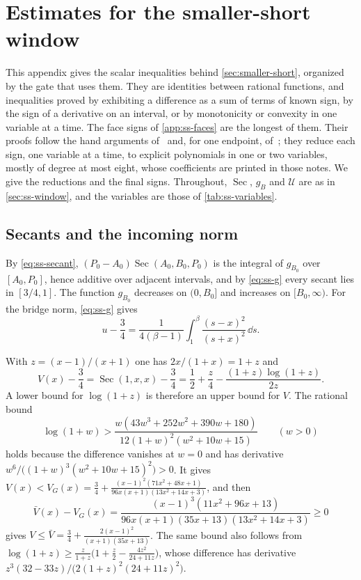 \section{Estimates for the smaller-short window}\label{app:short-estimates}

This appendix gives the scalar inequalities behind \cref{sec:smaller-short}, organized by the
gate that uses them. They are identities between rational functions, and inequalities proved by
exhibiting a difference as a sum of terms of known sign, by the sign of a derivative on an
interval, or by monotonicity or convexity in one variable at a time. The face signs of
\cref{app:ss-faces} are the longest of them. Their proofs follow the hand arguments
of~\cite{LighterProofs} and, for one endpoint, of~\cite{Notes}; they reduce each sign, one
variable at a time, to explicit polynomials in one or two variables, mostly of degree at most
eight, whose coefficients are printed in those notes. We give the reductions and the final signs.
Throughout, $\operatorname{Sec}$, $g_B$ and $\mathcal U$ are as in \cref{sec:ss-window}, and the
variables are those of \cref{tab:ss-variables}.

\subsection{Secants and the incoming norm}\label{app:ss-secant}

By \eqref{eq:ss-secant}, $(P_0-A_0)\operatorname{Sec}(A_0,B_0,P_0)$ is the integral of $g_{B_0}$
over $[A_0,P_0]$, hence additive over adjacent intervals, and by \eqref{eq:ss-g} every secant lies
in $[3/4,1]$. The function $g_{B_0}$ decreases on $(0,B_0]$ and increases on $[B_0,\infty)$. For
the bridge norm, \eqref{eq:ss-g} gives
\begin{equation}\label{eq:ss-u-integral}
  u-\frac34=\frac{1}{4(\beta-1)}\int_1^\beta\frac{(s-x)^2}{(s+x)^2}\,\dd s .
\end{equation}

 With $z=(x-1)/(x+1)$ one has $2x/(1+x)=1+z$ and
\[
  V(x)-\frac34=\operatorname{Sec}(1,x,x)-\frac34=\frac12+\frac z4-\frac{(1+z)\log(1+z)}{2z}.
\]
A lower bound for $\log(1+z)$ is therefore an upper bound for $V$. The rational bound
\[
  \log(1+w)>\frac{w(43w^3+252w^2+390w+180)}{12(1+w)^2(w^2+10w+15)}\qquad(w>0)
\]
holds because the difference vanishes at $w=0$ and has derivative
$w^6/\bigl((1+w)^3(w^2+10w+15)^2\bigr)>0$. It gives
$V(x)<V_G(x)=\frac34+\frac{(x-1)^2(71x^2+48x+1)}{96x(x+1)(13x^2+14x+3)}$, and then
\[
  \bar V(x)-V_G(x)=\frac{(x-1)^3(11x^2+96x+13)}{96x(x+1)(35x+13)(13x^2+14x+3)}\ge0
\]
gives $V\le\bar V=\frac34+\frac{2(x-1)^2}{(x+1)(35x+13)}$. The same bound also follows from
$\log(1+z)\ge\frac{z}{1+z}\bigl(1+\frac z2-\frac{4z^2}{24+11z}\bigr)$, whose difference has
derivative $z^3(32-33z)/\bigl(2(1+z)^2(24+11z)^2\bigr)$.

